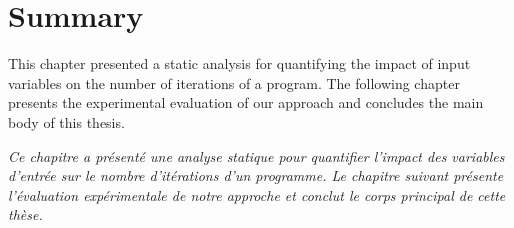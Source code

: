 \section{Summary}

This chapter presented a static analysis for quantifying the impact of input variables on the number of iterations of a program.
The following chapter presents the experimental evaluation of our approach and concludes the main body of this thesis.


\frenchdiv

\emph{Ce chapitre a présenté une analyse statique pour quantifier l'impact des variables d'entrée sur le nombre d'itérations d'un programme. Le chapitre suivant présente l'évaluation expérimentale de notre approche et conclut le corps principal de cette thèse.}

